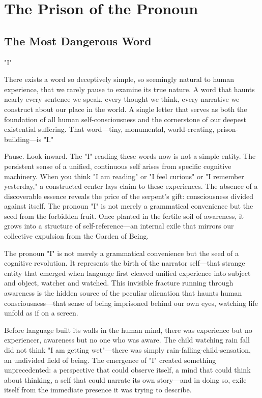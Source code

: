 \chapter{The Prison of the Pronoun}

\section{The Most Dangerous Word}

"I"

There exists a word so deceptively simple, so seemingly natural to human experience, that we rarely pause to examine its true nature. A word that haunts nearly every sentence we speak, every thought we think, every narrative we construct about our place in the world. A single letter that serves as both the foundation of all human self-consciousness and the cornerstone of our deepest existential suffering. That word—tiny, monumental, world-creating, prison-building—is "I."

Pause. Look inward. The "I" reading these words now is not a simple entity. The persistent sense of a unified, continuous self arises from specific cognitive machinery. When you think "I am reading" or "I feel curious" or "I remember yesterday," a constructed center lays claim to these experiences. The absence of a discoverable essence reveals the price of the serpent's gift: consciousness divided against itself. The pronoun "I" is not merely a grammatical convenience but the seed from the forbidden fruit. Once planted in the fertile soil of awareness, it grows into a structure of self-reference—an internal exile that mirrors our collective expulsion from the Garden of Being.

The pronoun "I" is not merely a grammatical convenience but the seed of a cognitive revolution. It represents the birth of the narrator self—that strange entity that emerged when language first cleaved unified experience into subject and object, watcher and watched. This invisible fracture running through awareness is the hidden source of the peculiar alienation that haunts human consciousness—that sense of being imprisoned behind our own eyes, watching life unfold as if on a screen.

Before language built its walls in the human mind, there was experience but no experiencer, awareness but no one who was aware. The child watching rain fall did not think "I am getting wet"—there was simply rain-falling-child-sensation, an undivided field of being. The emergence of "I" created something unprecedented: a perspective that could observe itself, a mind that could think about thinking, a self that could narrate its own story—and in doing so, exile itself from the immediate presence it was trying to describe.

